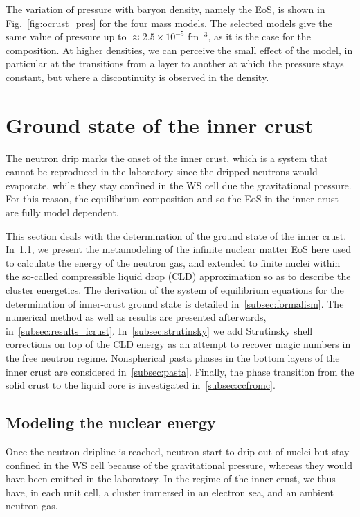 The variation of pressure with baryon density, namely the EoS, is shown in
Fig.~\ref{fig:ocrust_pres} for the four mass models. The selected models give 
the same value of pressure up to $\approx 2.5\times10^{-5}$ fm$^{-3}$, as it is 
the case for the composition. At higher densities, we can perceive the small 
effect of the model, in particular at the transitions from a layer to another 
at which the pressure stays constant, but where a discontinuity is observed in 
the density.


\section{Ground state of the inner crust}\label{sec:icrust_gs}

The neutron drip marks the onset of the inner crust, which is a system that
cannot be reproduced in the laboratory since the dripped neutrons would
evaporate, while they stay confined in the WS cell due the gravitational
pressure. For this reason, the equilibrium composition and so the EoS in the 
inner crust are fully model dependent.

This section deals with the determination of the ground state of the inner
crust. In~\ref{subsec:nucenergy}, we present the metamodeling of the
infinite nuclear matter EoS here used to calculate the energy of the neutron 
gas, and extended to finite nuclei within the so-called compressible liquid 
drop (CLD) approximation so as to describe the cluster energetics. The derivation of the 
system of equilibrium equations for the determination of inner-crust ground state 
is detailed in~\ref{subsec:formalism}. The numerical
method as well as results are presented afterwards, 
in~\ref{subsec:results_icrust}. In~\ref{subsec:strutinsky} we add Strutinsky
shell corrections on top of the CLD energy as an attempt to recover magic
numbers in the free neutron regime. Nonspherical pasta phases in the bottom 
layers of the inner crust are considered in~\ref{subsec:pasta}. Finally, the
phase transition from the solid crust to the liquid core is investigated 
in~\ref{subsec:ccfromc}.

\subsection{Modeling the nuclear energy}\label{subsec:nucenergy}

Once the neutron dripline is reached, neutron start to drip out of nuclei but
stay confined in the WS cell because of the gravitational pressure,
whereas they would have been emitted in the laboratory. In the regime of the inner
crust, we thus have, in each unit cell, a cluster immersed in an electron sea, 
and an ambient neutron gas.

